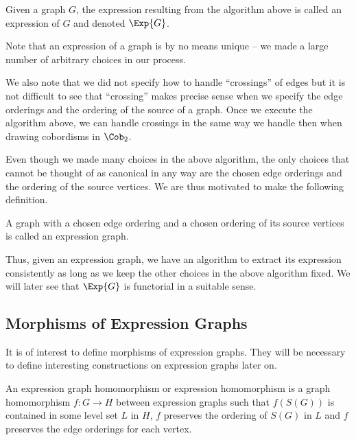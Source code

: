 \documentclass[./Thick_TQFTs_and_Quantum_Information.tex]{subfiles}
\begin{document}
\begin{defn}
Given a graph $G$, the expression resulting from the algorithm above is called
an expression of $G$ and denoted $\Exp{G}$.
\end{defn}

\begin{rmk}
Note that an expression of a graph is by no means unique -- we made a large
number of arbitrary choices in our process.
\end{rmk}

\begin{rmk} We also note that we did not specify how to handle ``crossings'' of
edges but it is not difficult to see that ``crossing'' makes precise sense when
we specify the edge orderings and the ordering of the source of a graph. Once we
execute the algorithm above, we can handle crossings in the same way we handle
then when drawing cobordisms in $\Cob_2$.
\end{rmk}

Even though we made many choices in the above algorithm, the only
choices that cannot be thought of as canonical in any way are the chosen edge
orderings and the ordering of the source vertices. We are thus motivated to make
the following definition.

\begin{defn}
A graph with a chosen edge ordering and a chosen ordering of its source vertices
is called an expression graph.
\end{defn}

Thus, given an expression graph, we have an algorithm to extract its expression
consistently as long as we keep the other choices in the above algorithm fixed.
We will later see that $\Exp{G}$ is functorial in a suitable sense.

\subsection{Morphisms of Expression Graphs}

It is of interest to define morphisms of expression graphs. They will be
necessary to define interesting constructions on expression graphs later on.

\begin{defn}
An expression graph homomorphism or expression homomorphism is a graph
homomorphism $f : G \to H$ between expression graphs such that $f(S(G))$ is
contained in some level set $L$ in $H$, $f$ preserves the ordering of $S(G)$ in
$L$ and $f$ preserves the edge orderings for each vertex.
\end{defn}
\end{document}
